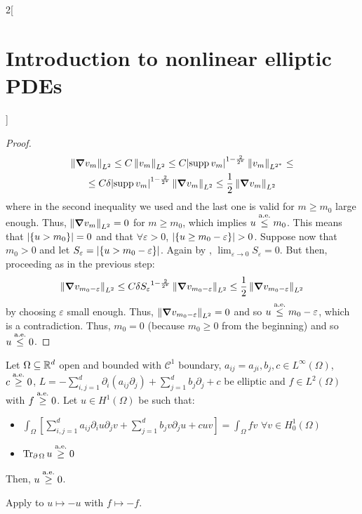 \documentclass[../../../main_math.tex]{subfiles}
\begin{document}
\begin{multicols}{2}[\section{Introduction to nonlinear elliptic PDEs}]
\begin{proof}
    \begin{multline*}
      \left\|\grad v_m\right\|_{L^2}\leq C \left\|v_m\right\|_{L^2}\leq C{\abs{\operatorname{supp} v_m}}^{1-\frac{2}{2^*}}\left\|v_m\right\|_{L^{2^*}}\leq \\
      \leq C\delta {\abs{\operatorname{supp}v_m}}^{1-\frac{2}{2^*}}\left\|\grad v_m\right\|_{L^2}\leq \frac{1}{2} \left\|\grad v_m\right\|_{L^2}
    \end{multline*}
    where in the second inequality we used  and the last one is valid for $m\geq m_0$ large enough. Thus, $\left\|\grad v_m\right\|_{L^2}=0$ for $m\geq m_0$, which implies $u\overset{\text{a.e.}}{\leq}m_0$. This means that $\abs{\{u>m_0\}}=0$ and that $\forall \varepsilon >0$, $\abs{\{u\geq m_0-\varepsilon\}}>0$. Suppose now that $m_0>0$ and let $S_\varepsilon=\abs{\{u> m_0-\varepsilon\}}$. Again by , $\displaystyle\lim_{\varepsilon\to 0}S_\varepsilon=0$. But then, proceeding as in the previous step:
    $$
      \left\|\grad v_{m_0-\varepsilon}\right\|_{L^2}\leq C \delta {S_\varepsilon}^{1-\frac{2}{2^*}}\left\|\grad v_{m_0-\varepsilon}\right\|_{L^2}\leq \frac{1}{2}\left\|\grad v_{m_0-\varepsilon}\right\|_{L^2}
    $$
    by choosing $\varepsilon$ small enough. Thus, $\left\|\grad v_{m_0-\varepsilon}\right\|_{L^2}=0$ and so $u\overset{\text{a.e.}}{\leq}m_0-\varepsilon$, which is a contradiction. Thus, $m_0= 0$ (because $m_0\geq 0$ from the beginning) and so $u\overset{\text{a.e.}}{\leq}0$.
  \end{proof}
  \begin{theorem}\label{INEPDE:weak_min_principle}
    Let $\Omega\subseteq\mathbb{R}^d$ open and bounded with $\mathcal{C}^1$ boundary, $a_{ij}=a_{ji},b_j,c\in L^\infty(\Omega)$, $c \overset{\text{a.e.}}{\geq}0$, $L=-\sum_{i,j=1}^d\partial_i(a_{ij}\partial_j)+\sum_{j=1}^db_j\partial_j+c$ be elliptic and $f\in L^2(\Omega)$ with $f\overset{\text{a.e.}}{\geq} 0$. Let $u\in H^1(\Omega)$ be such that:
    \begin{itemize}
      \item $\displaystyle \int_\Omega\left[\sum_{i,j=1}^da_{ij}\partial_iu\partial_jv+ \sum_{j=1}^db_jv\partial_ju+cuv\right]=\int_\Omega fv$ $\forall v\in H^1_0(\Omega)$
      \item $\Tr_{\operatorname{\partial}{\Omega}}u\overset{\text{a.e.}}{\geq}0$
    \end{itemize}
    Then, $u\overset{\text{a.e.}}{\geq}0$.
  \end{theorem}
  \begin{sproof}
    Apply  to $u\mapsto -u$ with $f\mapsto -f$.
  \end{sproof}
  \begin{corollary}\label{INEPDE:corollary_max_min}

\end{corollary}
\end{multicols}
\end{document}
